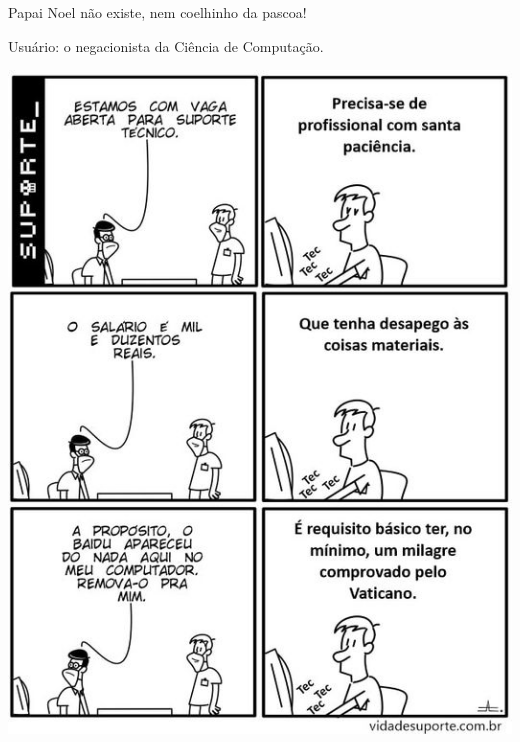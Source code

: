{\Large Papai Noel não existe, nem coelhinho da pascoa!}

{\Large Usuário: o negacionista da Ciência de Computação.}


\vfill\null
\columnbreak

\begin{center}
	\includegraphics[height=\textheight]{./IMG/TI.jpg}
\end{center}

